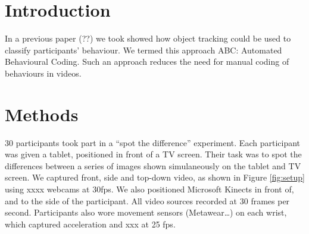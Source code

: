 \documentclass{sigchi-ext}
\begin{document}
\section{Introduction}

In a previous paper (??) we took showed how object tracking could be used to classify participants' behaviour.  We termed this approach ABC: Automated Behavioural Coding.  Such an approach reduces the need for manual coding of behaviours in videos.  


\section{Methods}

30 participants took part in a ``spot the difference'' experiment.  Each participant was given a tablet, positioned in front of a TV screen.   Their task was to spot the differences between a series of images shown simulaneously on the tablet and TV screen.  We captured front, side and top-down video, as shown in Figure \ref{fig:setup} using xxxx webcams at 30fps.  We also positioned Microsoft Kinects in front of, and to the side of the participant.  All video sources recorded at 30 frames per second. Participants also wore  movement sensors (Metawear\ldots) on each wrist, which captured acceleration and xxx at 25 fps.     
\end{document}
